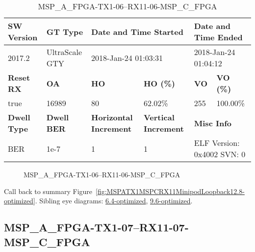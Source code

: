 \begin{table}[h]
\centering
\caption{MSP\_A\_FPGA-TX1-06--RX11-06-MSP\_C\_FPGA}
\label{tab:MSPAFPGATX106RX1106MSPCFPGA12.8-optimized}
\begin{tabular}{@{}|l|l|l|l|l|l|@{}}
\toprule
\textbf{SW Version}                & \textbf{GT Type}   & \multicolumn{2}{l|}{\textbf{Date and Time Started}}            & \multicolumn{2}{l|}{\textbf{Date and Time Ended}}        \\ \midrule
2017.2                       & UltraScale GTY          & \multicolumn{2}{l|}{2018-Jan-24 01:03:31}                   & \multicolumn{2}{l|}{2018-Jan-24 01:04:12}               \\ \midrule
\textbf{Reset RX}                  & \textbf{OA} & \textbf{HO}   & \textbf{HO (\%)} & \textbf{VO} & \textbf{VO (\%)} \\ \midrule
true & 16989        & 80          & 62.02\%        & 255        & 100.00\%       \\ \midrule
\textbf{Dwell Type}                & \textbf{Dwell BER} & \textbf{Horizontal Increment} & \textbf{Vertical Increment}    & \multicolumn{2}{l|}{\textbf{Misc Info}}                  \\ \midrule
BER                            & 1e-7        & 1        & 1           & \multicolumn{2}{l|}{ELF Version: 0x4002 SVN: 0}                         \\ \bottomrule
\end{tabular}
\end{table}

\begin{figure}[h]
\caption{MSP\_A\_FPGA-TX1-06--RX11-06-MSP\_C\_FPGA} \label{fig:MSPAFPGATX106RX1106MSPCFPGA12.8-optimized}
\end{figure}

Call back to summary Figure~\ref{fig:MSPATX1MSPCRX11MinipodLoopback12.8-optimized}.
Sibling eye diagrams: \hyperref[sec:MSPAFPGATX106RX1106MSPCFPGA6.4-optimized]{6.4-optimized}, \hyperref[sec:MSPAFPGATX106RX1106MSPCFPGA9.6-optimized]{9.6-optimized}.

\clearpage
\newpage


\subsection{MSP\_A\_FPGA-TX1-07--RX11-07-MSP\_C\_FPGA}\label{sec:MSPAFPGATX107RX1107MSPCFPGA12.8-optimized}

